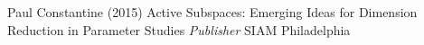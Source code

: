 \documentclass{beamer}
\begin{document}

\begin{frame}
\begin{thebibliography}{99}
 Paul Constantine (2015)
\newblock Active Subspaces: Emerging Ideas for Dimension Reduction in Parameter Studies
\newblock \emph{Publisher} SIAM Philadelphia
\end{thebibliography}
\end{frame}

\end{document}
